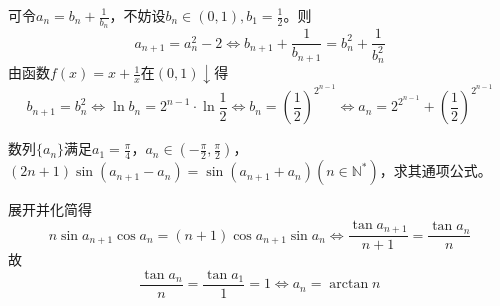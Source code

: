 \documentclass[../sample]{subfiles}
\begin{document}
可令$a_n=b_n+\frac{1}{b_n}$，不妨设$b_n\in (0,1), b_1=\frac{1}{2}$。则\[a_{n+1}=a_n^2-2\Leftrightarrow b_{n+1}+\frac{1}{b_{n+1}}=b_n^2+\frac{1}{b_n^2}\]
由函数$f(x)=x+\frac{1}{x}在(0, 1)\downarrow$得\[b_{n+1}=b_n^2\Leftrightarrow \ln b_n=2^{n-1}·\ln \frac{1}{2}\Leftrightarrow b_n=(\frac{1}{2})^{2^{n-1}}\Leftrightarrow a_n=2^{2^{n-1}}+(\frac{1}{2})^{2^{n-1}}\]

\begin{problem}
  数列$\{a_n\}$满足$a_1=\frac{\pi}{4}$，$ a_n\in (-\frac{\pi}{2}, \frac{\pi}{2})$，$ (2n+1)\sin(a_{n+1}-a_n)=\sin(a_{n+1}+a_n)(n\in\mathbb{N^*})$，求其通项公式。
\end{problem}

展开并化简得\[n\sin a_{n+1}\cos a_n=(n+1)\cos a_{n+1}\sin a_n\Leftrightarrow \frac{\tan a_{n+1}}{n+1}=\frac{\tan a_n}{n}\]
故\[\frac{\tan a_n}{n}=\frac{\tan a_1}{1}=1\Leftrightarrow a_n=\arctan n\]
\end{document}
